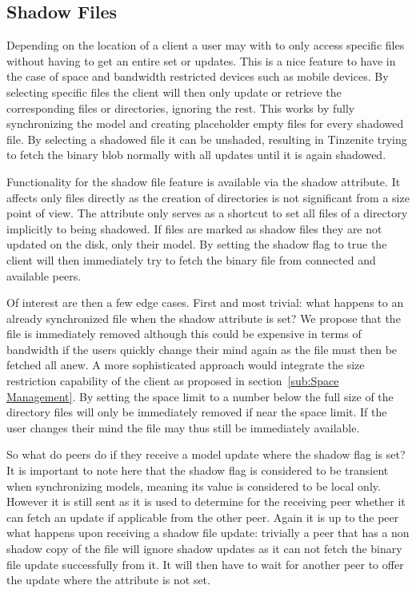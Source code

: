 \subsection{Shadow Files}
\label{sub:Shadow Files}

Depending on the location of a client a user may with to only access specific files without having to get an entire set or updates.
This is a nice feature to have in the case of space and bandwidth restricted devices such as mobile devices.
By selecting specific files the client will then only update or retrieve the corresponding files or directories, ignoring the rest.
This works by fully synchronizing the model and creating placeholder empty files for every shadowed file.
By selecting a shadowed file it can be unshaded, resulting in Tinzenite trying to fetch the binary blob normally with all updates until it is again shadowed.

Functionality for the shadow file feature is available via the shadow attribute.
It affects only files directly as the creation of directories is not significant from a size point of view.
The attribute only serves as a shortcut to set all files of a directory implicitly to being shadowed.
If files are marked as shadow files they are not updated on the disk, only their model.
By setting the shadow flag to true the client will then immediately try to fetch the binary file from connected and available peers.

Of interest are then a few edge cases.
First and most trivial: what happens to an already synchronized file when the shadow attribute is set?
We propose that the file is immediately removed although this could be expensive in terms of bandwidth if the users quickly change their mind again as the file must then be fetched all anew.
A more sophisticated approach would integrate the size restriction capability of the client as proposed in section~\ref{sub:Space Management}.
By setting the space limit to a number below the full size of the directory files will only be immediately removed if near the space limit.
If the user changes their mind the file may thus still be immediately available.

So what do peers do if they receive a model update where the shadow flag is set?
It is important to note here that the shadow flag is considered to be transient when synchronizing models, meaning its value is considered to be local only.
However it is still sent as it is used to determine for the receiving peer whether it can fetch an update if applicable from the other peer.
Again it is up to the peer what happens upon receiving a shadow file update: trivially a peer that has a non shadow copy of the file will ignore shadow updates as it can not fetch the binary file update successfully from it.
It will then have to wait for another peer to offer the update where the attribute is not set.

